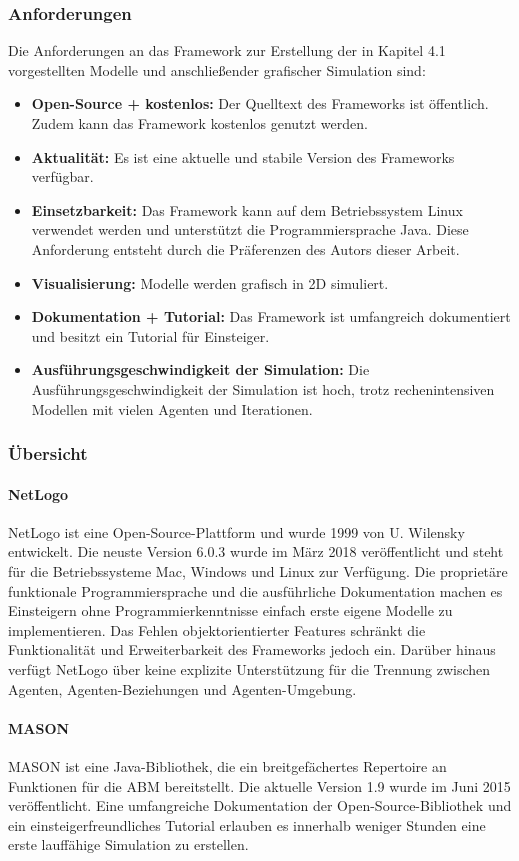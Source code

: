 \documentclass[a4paper, 11pt]{article}
\begin{document}
\subsubsection{Anforderungen}
Die Anforderungen an das Framework zur Erstellung der in Kapitel 4.1 vorgestellten Modelle und anschließender grafischer Simulation sind:
\begin{itemize}
	\item \textbf{Open-Source + kostenlos:} Der Quelltext des Frameworks ist öffentlich. Zudem kann das Framework kostenlos genutzt werden.
	\item \textbf{Aktualität:} Es ist eine aktuelle und stabile Version des Frameworks verfügbar. 
	\item \textbf{Einsetzbarkeit:} Das Framework kann auf dem Betriebssystem Linux verwendet werden und unterstützt die Programmiersprache Java. Diese Anforderung entsteht durch die Präferenzen des Autors dieser Arbeit.
	\item \textbf{Visualisierung:} Modelle werden grafisch in 2D simuliert.
	\item \textbf{Dokumentation + Tutorial:} Das Framework ist umfangreich dokumentiert und besitzt ein Tutorial für Einsteiger.
	\item \textbf{Ausführungsgeschwindigkeit der Simulation:} Die Ausführungsgeschwindigkeit der Simulation ist hoch, trotz rechenintensiven Modellen mit vielen Agenten und Iterationen.
\end{itemize}
\subsubsection{Übersicht}
\paragraph{NetLogo}
NetLogo ist eine Open-Source-Plattform und wurde 1999 von U. Wilensky entwickelt. Die neuste Version 6.0.3 wurde im März 2018 veröffentlicht und steht für die Betriebssysteme Mac, Windows und Linux zur Verfügung. Die proprietäre funktionale Programmiersprache und die ausführliche Dokumentation machen es Einsteigern ohne Programmierkenntnisse einfach erste eigene Modelle zu implementieren. Das Fehlen objektorientierter Features schränkt die Funktionalität und Erweiterbarkeit des Frameworks jedoch ein. Darüber hinaus verfügt NetLogo über keine explizite Unterstützung für die Trennung zwischen Agenten, Agenten-Beziehungen und Agenten-Umgebung.
\paragraph{MASON}
\ac{MASON} ist eine Java-Bibliothek, die ein breitgefächertes Repertoire an Funktionen für die \acs{ABM} bereitstellt. Die aktuelle Version 1.9 wurde im Juni 2015 veröffentlicht. Eine umfangreiche Dokumentation der Open-Source-Bibliothek und ein einsteigerfreundliches Tutorial erlauben es innerhalb weniger Stunden eine erste lauffähige Simulation zu erstellen.
\end{document}
